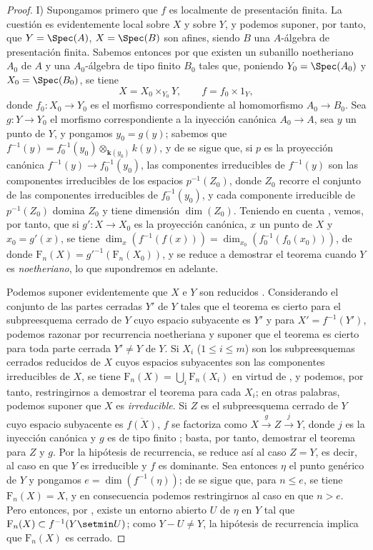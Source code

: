 \begin{proof}
I) Supongamos primero que $f$ es localmente de presentación finita.
La cuestión es evidentemente local sobre $X$ y sobre $Y$, y podemos suponer, por tanto, que $Y=\Spec(A)$, $X=\Spec(B)$ son afines, siendo $B$ una $A$-álgebra de presentación finita.
Sabemos entonces por  que existen un subanillo noetheriano $A_0$ de $A$ y una $A_0$-álgebra de tipo finito $B_0$ tales que, poniendo $Y_0=\Spec(A_0)$ y $X_0=\Spec(B_0)$, se tiene
\[
X=X_0\times_{Y_0}Y,\qquad f=f_0\times 1_Y,
\]
donde $f_0:X_0\to Y_0$ es el morfismo correspondiente al homomorfismo $A_0\to B_0$.
Sea $g:Y\to Y_0$ el morfismo correspondiente a la inyección canónica $A_0\to A$, sea $y$ un punto de $Y$, y pongamos $y_0=g(y)$; sabemos que $f^{-1}(y)=f_0^{-1}(y_0)\otimes_{\mathbf k(y_0)}k(y)$, y de  se sigue que, si $p$ es la proyección canónica $f^{-1}(y)\to f_0^{-1}(y_0)$, las componentes irreducibles de $f^{-1}(y)$ son las componentes irreducibles de los espacios $p^{-1}(Z_0)$, donde $Z_0$ recorre el conjunto de las componentes irreducibles de $f_0^{-1}(y_0)$, y cada componente irreducible de $p^{-1}(Z_0)$ domina $Z_0$ y tiene dimensión $\dim(Z_0)$.
Teniendo en cuenta , vemos, por tanto, que si $g':X\to X_0$ es la proyección canónica, $x$ un punto de $X$ y $x_0=g'(x)$, se tiene $\dim_x(f^{-1}(f(x)))=\dim_{x_0}(f_0^{-1}(f_0(x_0)))$, de donde $\mathrm{F}_n(X)={g'}^{-1}(\mathrm{F}_n(X_0))$, y se reduce a demostrar el teorema cuando $Y$ es \emph{noetheriano}, lo que supondremos en adelante.

Podemos suponer evidentemente que $X$ e $Y$ son reducidos .
Considerando el conjunto de las partes cerradas $Y'$ de $Y$ tales que el teorema es cierto para el subpreesquema cerrado de $Y$ cuyo espacio subyacente es $Y'$ y para $X'=f^{-1}(Y')$, podemos razonar por recurrencia noetheriana  y suponer que el teorema es cierto para toda parte cerrada $Y'\neq Y$ de $Y$.
Si $X_i$ ($1\leq i\leq m$) son los subpreesquemas cerrados reducidos de $X$ cuyos espacios subyacentes son las componentes irreducibles de $X$, se tiene $\mathrm{F}_n(X)=\bigcup_i\mathrm{F}_n(X_i)$ en virtud de , y podemos, por tanto, restringirnos a demostrar el teorema para cada $X_i$; en otras palabras, podemos suponer que $X$ es \emph{irreducible}.
Si $Z$ es el subpreesquema cerrado de $Y$ cuyo espacio subyacente es $\overline{f(X)}$, $f$ se factoriza como $X\xrightarrow{g}Z\xrightarrow{j}Y$, donde $j$ es la inyección canónica  y $g$ es de tipo finito ; basta, por tanto, demostrar el teorema para $Z$ y $g$. Por la hipótesis de recurrencia, se reduce así al caso $Z=Y$, es decir, al caso en que $Y$ es irreducible y $f$ es dominante.
Sea entonces $\eta$ el punto genérico de $Y$ y pongamos $e=\dim(f^{-1}(\eta))$; de  se sigue que, para $n\leq e$, se tiene $\mathrm{F}_n(X)=X$, y en consecuencia podemos restringirnos al caso en que $n>e$.
Pero entonces, por , existe un entorno abierto $U$ de $\eta$ en $Y$ tal que $\mathrm{F}_n(X)\subset f^{-1}(Y\setmin U)$; como $Y-U\neq Y$, la hipótesis de recurrencia implica que $\mathrm{F}_n(X)$ es cerrado.


\end{proof}
